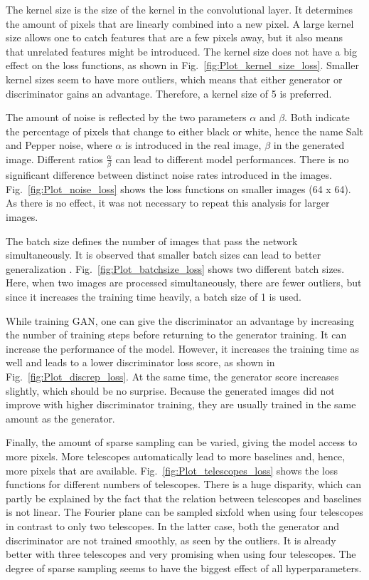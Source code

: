 The kernel size is the size of the kernel in the convolutional layer. It determines the amount of pixels that are linearly combined into a new pixel. A large kernel size allows one to catch features that are a few pixels away, but it also means that unrelated features might be introduced. The kernel size does not have a big effect on the loss functions, as shown in Fig.~\ref{fig:Plot_kernel_size_loss}. Smaller kernel sizes seem to have more outliers, which means that either generator or discriminator gains an advantage. Therefore, a kernel size of 5 is preferred.

The amount of noise is reflected by the two parameters $\alpha$ and $\beta$. Both indicate the percentage of pixels that change to either black or white, hence the name Salt and Pepper noise, where $\alpha$ is introduced in the real image, $\beta$ in the generated image. Different ratios $\frac{\alpha}{\beta}$ can lead to different model performances. There is no significant difference between distinct noise rates introduced in the images. Fig.~\ref{fig:Plot_noise_loss} shows the loss functions on smaller images (64 x 64). As there is no effect, it was not necessary to repeat this analysis for larger images. 

The batch size defines the number of images that pass the network simultaneously. It is observed that smaller batch sizes can lead to better generalization \citep{prince2023understanding}. Fig.~\ref{fig:Plot_batchsize_loss} shows two different batch sizes. Here, when two images are processed simultaneously, there are fewer outliers, but since it increases the training time heavily, a batch size of 1 is used.

While training GAN, one can give the discriminator an advantage by increasing the number of training steps before returning to the generator training. It can increase the performance of the model. However, it increases the training time as well and leads to a lower discriminator loss score, as shown in Fig.~\ref{fig:Plot_discrep_loss}. At the same time, the generator score increases slightly, which should be no surprise. Because the generated images did not improve with higher discriminator training, they are usually trained in the same amount as the generator.

Finally, the amount of sparse sampling can be varied, giving the model access to more pixels. More telescopes automatically lead to more baselines and, hence, more pixels that are available. Fig.~\ref{fig:Plot_telescopes_loss} shows the loss functions for different numbers of telescopes. There is a huge disparity, which can partly be explained by the fact that the relation between telescopes and baselines is not linear. The Fourier plane can be sampled sixfold when using four telescopes in contrast to only two telescopes. In the latter case, both the generator and discriminator are not trained smoothly, as seen by the outliers. It is already better with three telescopes and very promising when using four telescopes. The degree of sparse sampling seems to have the biggest effect of all hyperparameters.